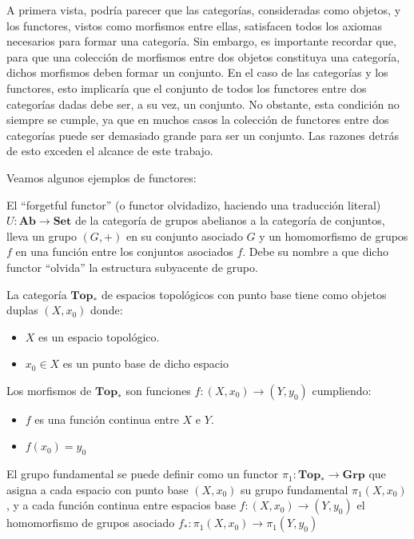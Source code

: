 A primera vista, podría parecer que las categorías, consideradas como objetos, y los functores, vistos como morfismos entre ellas, satisfacen todos los axiomas necesarios para formar una categoría. Sin embargo, es importante recordar que, para que una colección de morfismos entre dos objetos constituya una categoría, dichos morfismos deben formar un conjunto. En el caso de las categorías y los functores, esto implicaría que el conjunto de todos los functores entre dos categorías dadas debe ser, a su vez, un conjunto. No obstante, esta condición no siempre se cumple, ya que en muchos casos la colección de functores entre dos categorías puede ser demasiado grande para ser un conjunto. Las razones detrás de esto exceden el alcance de este trabajo.

Veamos algunos ejemplos de functores:

\begin{ejemplo}
    El ``forgetful functor'' (o functor olvidadizo, haciendo una traducción literal) $U: \textbf{Ab} \longrightarrow \textbf{Set} $ de la categoría de grupos abelianos a la categoría de conjuntos, lleva un grupo $(G,+)$ en su conjunto asociado $G$ y un homomorfismo de grupos $f$ en una función entre los conjuntos asociados $f$. Debe su nombre a que dicho functor ``olvida'' la estructura subyacente de grupo.
    \label{ej:forgetful}
\end{ejemplo}

\begin{ejemplo}
     La categoría $\textbf{Top}_{*}$ de espacios topológicos con punto base tiene como objetos duplas $(X,x_{0})$ donde:
    \begin{itemize}
        \item $X$ es un espacio topológico.
        \item $x_{0} \in X$ es un punto base de dicho espacio 
    \end{itemize}
    Los morfismos de $\textbf{Top}_{*}$ son funciones $f: (X,x_{0}) \longrightarrow (Y,y_{0})$ cumpliendo:
    \begin{itemize}
        \item $f$ es una función continua entre $X$ e $Y$.
        \item $f(x_{0}) = y_{0}$ 
    \end{itemize}
    El grupo fundamental se puede definir como un functor $\pi_{1}: \textbf{Top}_{*} \longrightarrow \textbf{Grp} $ que asigna a cada espacio con punto base $(X,x_{0})$ su grupo fundamental $\pi_{1}(X,x_{0})$, y a cada función continua entre espacios base $f: (X,x_{0}) \longrightarrow (Y,y_{0})$ el homomorfismo de grupos asociado $f_{*}: \pi_{1}(X,x_{0}) \longrightarrow \pi_{1}(Y,y_{0})$
\end{ejemplo}

